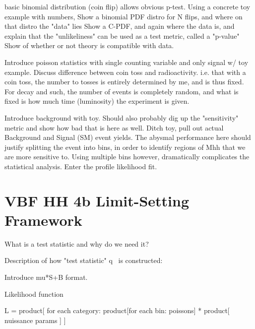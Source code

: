     basic binomial distribution (coin flip) allows obvious p-test. 
    Using a concrete toy example with numbers,
    Show a binomial PDF distro for N flips, and where on that distro the "data" lies
    Show a C-PDF, and again where the data is,
        and explain that the "unlikeliness" can be used as a test metric, called a "p-value"
    Show of whether or not theory is compatible with data.

    Introduce poisson statistics with single counting variable and only signal w/ toy example.
    Discuss difference between coin toss and radioactivity.
    i.e. that with a coin toss, the number to tosses is entirely determined by me, and is thus fixed.
    For decay and such, the number of events is completely random, and what is fixed is how much time (luminosity)
        the experiment is given.

    Introduce background with toy.
    Should also probably dig up the "sensitivity" metric and show how bad that is here as well.
    Ditch toy, pull out actual Background and Signal (SM) event yields.
    The abysmal performance here should justify splitting the event into bins,
        in order to identify regions of Mhh that we are more sensitive to.
    Using multiple bins however, dramatically complicates the statistical analysis.
    Enter the profile likelihood fit.


\section{VBF \to HH \to 4b Limit-Setting Framework}

    What is a test statistic and why do we need it?

    Description of how "test statistic" q~ is constructed:

    Introduce mu*S+B format.

    Likelihood function

        L = product[ for each category:
            product[for each bin: poissons]
            * product[ nuissance params ] 
        ]


